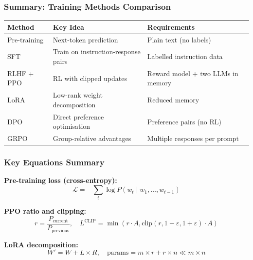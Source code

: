 \bigseparator

\subsubsection{Summary: Training Methods Comparison}

\begin{center}
\renewcommand{\arraystretch}{1.3}
\begin{tabular}{@{} l p{4cm} p{4cm} @{}}
\toprule
\textbf{Method} & \textbf{Key Idea} & \textbf{Requirements} \\
\midrule
Pre-training & Next-token prediction & Plain text (no labels) \\
SFT & Train on instruction-response pairs & Labelled instruction data \\
RLHF + PPO & RL with clipped updates & Reward model + two LLMs in memory \\
LoRA & Low-rank weight decomposition & Reduced memory \\
DPO & Direct preference optimisation & Preference pairs (no RL) \\
GRPO & Group-relative advantages & Multiple responses per prompt \\
\bottomrule
\end{tabular}
\end{center}

\bigseparator

\subsubsection{Key Equations Summary}

\begin{thmbox}
\textbf{Pre-training loss (cross-entropy):}
\[
\mathcal{L} = -\sum_{t} \log P(w_t \mid w_1, \ldots, w_{t-1})
\]

\textbf{PPO ratio and clipping:}
\[
r = \frac{P_{\text{current}}}{P_{\text{previous}}}, \quad L^{\text{CLIP}} = \min(r \cdot A, \text{clip}(r, 1-\varepsilon, 1+\varepsilon) \cdot A)
\]

\textbf{LoRA decomposition:}
\[
W' = W + L \times R, \quad \text{params} = m \times r + r \times n \ll m \times n
\]
\end{thmbox}

